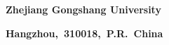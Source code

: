 \begin{center}
\textbf{
        Zhejiang Gongshang University
}
\end{center}
\begin{center}
    \textbf{
        Hangzhou,~310018,~P.R.~China
    }
\end{center}